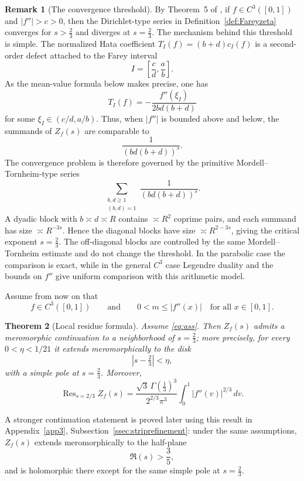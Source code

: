 \documentclass[a4paper,american,11pt]{amsart}
\theoremstyle{plain}
\newtheorem{theorem}{Theorem}[section]
\theoremstyle{definition}
\newtheorem{remark}[theorem]{Remark}
\DeclareMathOperator*{\Res}{Res}
\begin{document}
\begin{remark}[The convergence threshold]
By Theorem~5 of \cite{kalinin2024legendre}, if
\(f\in C^3([0,1])\) and \(|f''|>c>0\), then the Dirichlet-type series in
Definition~\ref{def:Fareyzeta} converges for \(s>\frac23\) and diverges at
\(s=\frac23\). The mechanism behind this threshold is simple. The normalized
Hata coefficient \(T_I(f)=(b+d)c_I(f)\) is a second-order defect attached to
the Farey interval
\[
I=\left[\frac cd,\frac ab\right].
\]
As the mean-value formula below makes precise, one has
\[
T_I(f)
=
-\frac{f''(\xi_I)}{2bd(b+d)}
\]
for some \(\xi_I\in(c/d,a/b)\). Thus, when \(|f''|\) is bounded above and
below, the summands of \(Z_f(s)\) are comparable to
\[
\frac{1}{(bd(b+d))^s}.
\]
The convergence problem is therefore governed by the primitive
Mordell--Tornheim-type series
\[
\sum_{\substack{b,d\ge1\\(b,d)=1}}
\frac{1}{(bd(b+d))^s}.
\]
A dyadic block with \(b\asymp d\asymp R\) contains \(\asymp R^2\) coprime
pairs, and each summand has size \(\asymp R^{-3s}\). Hence the diagonal
blocks have size \(\asymp R^{2-3s}\), giving the critical exponent
\(s=\frac23\). The off-diagonal blocks are controlled by the same
Mordell--Tornheim estimate and do not change the threshold. In the parabolic
case the comparison is exact, while in the general \(C^3\) case Legendre
duality and the bounds on \(f''\) give uniform comparison with this arithmetic
model.
\end{remark}

Assume from now on that
\begin{equation}
\label{eq:ass}
f\in C^3([0,1])
\qquad\text{and}\qquad
0<m\le |f''(x)|
\quad\text{for all }x\in[0,1].
\end{equation}

\begin{theorem}[Local residue formula]
\label{thm:res}
Assume \eqref{eq:ass}. Then \(Z_f(s)\) admits a meromorphic continuation to
a neighborhood of \(s=\frac23\); more precisely, for every
\(0<\eta<1/21\) it extends meromorphically to the disk
\[
|s-\tfrac23|<\eta,
\]
with a simple pole at \(s=\frac23\). Moreover,
\[
\Res_{s=2/3} Z_f(s)
=
\frac{\sqrt3\,\Gamma\!\left(\frac13\right)^3}{2^{2/3}\pi^3}
\int_0^1 |f''(v)|^{2/3}\,dv.
\]
\end{theorem}

A stronger continuation statement is proved later using this result in
Appendix~\ref{app3}, Subsection~\ref{ssec:striprefinement}: under the same
assumptions, \(Z_f(s)\) extends meromorphically to the half-plane
\[
\Re(s)>\frac35,
\]
and is holomorphic there except for the same simple pole at \(s=\frac23\).
\end{document}
